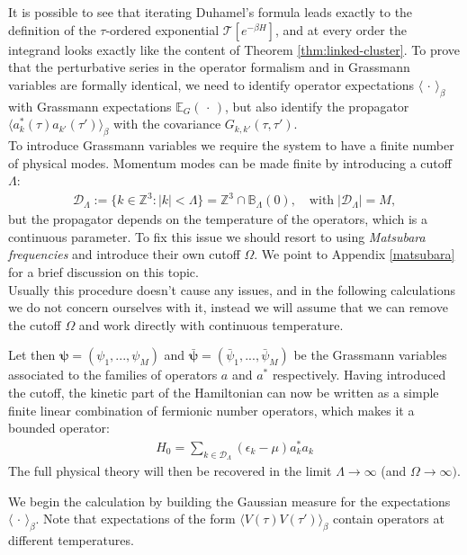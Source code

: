 It is possible to see that iterating Duhamel's formula leads exactly to the definition of the
$\tau$-ordered exponential $\mathcal{T}[e^{-\beta H}]$, and at every order the integrand looks
exactly like the content of Theorem \ref{thm:linked-cluster}. To prove that the perturbative
series in the operator formalism and in Grassmann variables are formally identical, we need to
identify operator expectations $\langle\,\cdot\,\rangle_\beta$ with Grassmann expectations
$\mathbb{E}_G(\,\cdot\,)$, but also identify the propagator $\langle a^*_k(\tau)a_{k'}(\tau')
\rangle_\beta$ with the covariance $G_{k,k'}(\tau,\tau')$.
\\
To introduce Grassmann variables we require the system to have a finite number of physical
modes. Momentum modes can be made finite by introducing a cutoff $\Lambda$:
\begin{align*}
	\mathcal{D}_\Lambda := \{ k\in\mathbb{Z}^3 : \vert k\vert < \Lambda \} = \mathbb{Z}^3\cap\mathbb{B}_\Lambda(0),
	\quad\mathrm{with}\;\vert\mathcal{D}_\Lambda\vert = M,
\end{align*}
but the propagator depends on the temperature of the operators, which is a continuous
parameter. To fix this issue we should resort to using \textit{Matsubara frequencies} and
introduce their own cutoff $\Omega$. We point to Appendix \ref{matsubara} for a brief
discussion on this topic.
\\
Usually this procedure doesn't cause any issues, and in the following calculations we do not
concern ourselves with it, instead we will assume that we can remove the cutoff $\Omega$ and
work directly with continuous temperature.

Let then $\boldsymbol{\psi} = (\psi_1, ..., \psi_M)$ and
$\boldsymbol{\bar\psi} = (\bar\psi_1, ..., \bar\psi_M)$ be the Grassmann variables
associated to the families of operators $a$ and $a^*$ respectively.
Having introduced the cutoff, the kinetic part of the Hamiltonian can now be written as a
simple finite linear combination of fermionic number operators, which makes it a
bounded operator:
\begin{align*}
	H_0 = \sum_{k \in \mathcal{D}_\Lambda} (\epsilon_k-\mu) a^*_k a_k
\end{align*}
The full physical theory will then be recovered in the limit $\Lambda\to\infty$ (and $\Omega
\to\infty)$.

We begin the calculation by building the Gaussian measure for the expectations $\langle\,\cdot
\,\rangle_\beta$. Note that expectations of the form $\langle V(\tau)V(\tau')\rangle_\beta$
contain operators at different temperatures.

